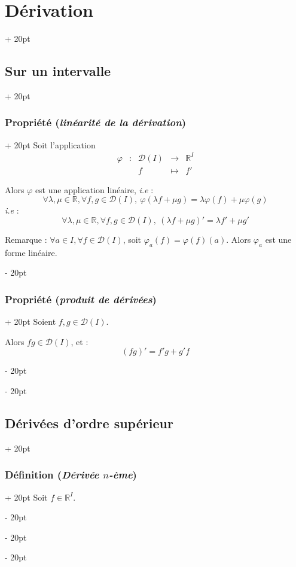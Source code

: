 \documentclass[a4paper, 12pt, twoside]{article}
\newcommand{\R}{\mathbb{R}} %
\newcommand{\ind}[1][20pt]{\advance\leftskip + #1}
\newcommand{\deind}[1][20pt]{\advance\leftskip - #1}
\newenvironment{indt}[2][20pt]{#2 \par \ind[#1]}{\par \deind} %
\begin{document}
\begin{indt}{\section{Dérivation}}
\begin{indt}{\subsection{Sur un intervalle}}
            \begin{indt}{\subsubsection{Propriété (\textit{linéarité de la dérivation})}}
                Soit l'application
                \[
                    \begin{array}{rcccc}
                        \varphi & : & \mathcal D(I) & \longrightarrow & \R^I
                        \\
                        && f & \longmapsto & f'
                    \end{array}
                \]

                Alors $\varphi$ est une application linéaire, \textit{i.e} :
                \[
                    \forall \lambda, \mu \in \R, \forall f, g \in \mathcal D(I),\
                    \varphi(\lambda f + \mu g) = \lambda \varphi(f) + \mu \varphi(g)
                \]
                \textit{i.e} :
                \[
                    \forall \lambda, \mu \in \R, \forall f, g \in \mathcal D(I),\
                    (\lambda f + \mu g)' = \lambda f' + \mu g'
                \]

                \vspace{12pt}
                
                Remarque : $\forall a \in I, \forall f \in \mathcal D(I)$, soit $\varphi_a(f) = \varphi(f)(a)$.
                Alors $\varphi_a$ est une forme linéaire.
            \end{indt}

            \vspace{12pt}
            
            \begin{indt}{\subsubsection{Propriété (\textit{produit de dérivées})}}
                Soient $f, g \in \mathcal D(I)$.

                Alors $fg \in \mathcal D(I)$, et :
                \[
                    (fg)' = f'g + g'f
                \]
            \end{indt}
        \end{indt}

        \vspace{12pt}
        
        \begin{indt}{\subsection{Dérivées d'ordre supérieur}}
            \begin{indt}{\subsubsection{Définition (\textit{Dérivée $n$-ème})}}
                Soit $f \in \R^I$.


\end{indt}
\end{indt}
\end{indt}
\end{document}
